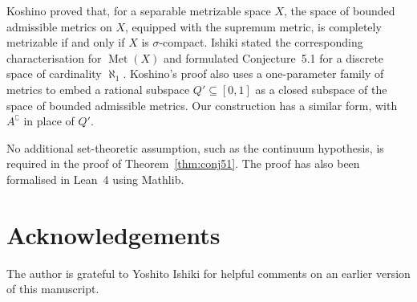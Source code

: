 \documentclass[12pt]{article}
\theoremstyle{definition}
\newcommand{\Met}{\operatorname{Met}}
\begin{document}
Koshino \cite{Koshino2024} proved that, for a separable metrizable space
$X$, the space of bounded admissible metrics on $X$, equipped with the
supremum metric, is completely metrizable if and only if $X$ is
$\sigma$-compact. Ishiki \cite{Ishiki2024} stated the corresponding
characterisation for $\Met(X)$ and formulated Conjecture~5.1 for a
discrete space of cardinality $\aleph_1$. Koshino's proof also uses a
one-parameter family of metrics to embed a rational subspace
$Q'\subseteq[0,1]$ as a closed subspace of the space of bounded
admissible metrics. Our construction has a similar form, with
$A^\complement$ in place of $Q'$.

No additional set-theoretic assumption, such as the continuum
hypothesis, is required in the proof of Theorem~\ref{thm:conj51}. The
proof has also been formalised in Lean~4 using Mathlib.

\section*{Acknowledgements}

The author is grateful to Yoshito Ishiki for helpful comments on an
earlier version of this manuscript.



\end{document}
